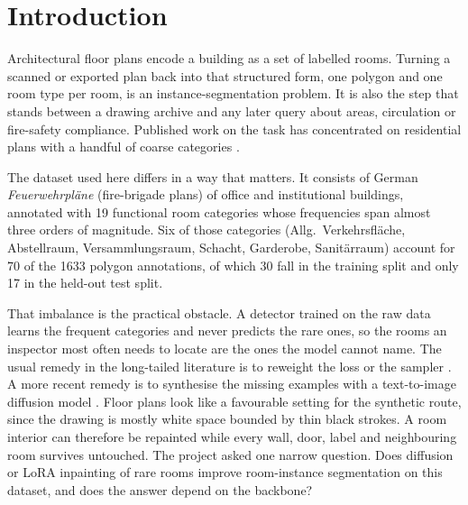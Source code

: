 \setcounter{page}{1}
\section{Introduction}

Architectural floor plans encode a building as a set of labelled rooms. Turning
a scanned or exported plan back into that structured form, one polygon and one
room type per room, is an instance-segmentation problem. It is also the step
that stands between a drawing archive and any later query about areas,
circulation or fire-safety compliance. Published work on the task has
concentrated on residential plans with a handful of coarse categories
\cite{kalervo2019cubicasa5k,kratochvila2024multiunit}.

The dataset used here differs in a way that matters. It consists of German
\emph{Feuerwehrpl\"ane} (fire-brigade plans) of office and institutional
buildings, annotated with 19 functional room categories whose frequencies span
almost three orders of magnitude. Six of those categories (Allg.\
Verkehrsfl\"ache, Abstellraum, Versammlungsraum, Schacht, Garderobe,
Sanit\"arraum) account for 70 of the 1633 polygon annotations, of which 30 fall
in the training split and only 17 in the held-out test split.

That imbalance is the practical obstacle. A detector trained on the raw data
learns the frequent categories and never predicts the rare ones, so the rooms an
inspector most often needs to locate are the ones the model cannot name. The
usual remedy in the long-tailed literature is to reweight the loss or the
sampler \cite{wang2021seesaw}. A more recent remedy is to synthesise the missing
examples with a text-to-image diffusion model
\cite{xie2024mosaicfusion,shin2023fillup,wang2024doge}. Floor plans look like a
favourable setting for the synthetic route, since the drawing is mostly white
space bounded by thin black strokes. A room interior can therefore be repainted
while every wall, door, label and neighbouring room survives untouched. The
project asked one narrow question. Does diffusion or LoRA inpainting of rare
rooms improve room-instance segmentation on this dataset, and does the answer
depend on the backbone?

